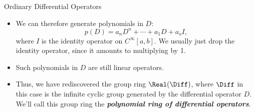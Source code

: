 \begin{frame}
Ordinary Differential Operators
 \begin{itemize}
 \item We can therefore generate polynomials in $D$:
 \[p(D)=a_nD^n+\cdots +a_1D+a_oI,\]
 where $I$ is the identity operator on $C^\infty[a,b]$.  We
 usually just drop the identity operator, since it amounts to multiplying by 1.
 \item Such polynomials in $D$ are still linear operators.
 \item Thus, we have rediscovered the group
 ring $\Real(\Diff)$, where $\Diff$ in this case is the infinite cyclic
 group generated by the differential operator $D$.  We'll call
 this group ring 
 the \textit{\textbf{polynomial ring of differential operators}}.
\end{itemize}
\end{frame}
